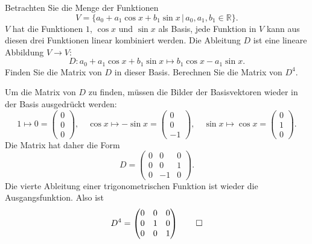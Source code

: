 Betrachten Sie die Menge der Funktionen
\[
V=\{
a_0+a_1\cos x+b_1\sin x\,|\,a_0,a_1,b_1\in\mathbb R\}.
\]
$V$ hat die Funktionen $1$, $\cos x$ und $\sin x$ als Basis,
jede Funktion in $V$ kann aus diesen drei Funktionen linear
kombiniert werden.
Die Ableitung $D$ ist eine lineare Abbildung $V\to V$:
\[
D:a_0+a_1\cos x+b_1\sin x\mapsto b_1\cos x -a_1\sin x.
\]
Finden Sie die Matrix von $D$ in dieser Basis. Berechnen Sie
die Matrix von $D^4$.


\begin{loesung}
Um die Matrix von $D$ zu finden, müssen die Bilder der
Basisvektoren wieder in der Basis ausgedrückt werden:
\[
1\mapsto 0=\begin{pmatrix}0\\0\\0\end{pmatrix},\quad
\cos x\mapsto -\sin x=\begin{pmatrix}0\\0\\-1\end{pmatrix},\quad
\sin x\mapsto \cos x=\begin{pmatrix}0\\1\\0\end{pmatrix}.
\]
Die Matrix hat daher die Form
\[
D=\begin{pmatrix}
0&0&0\\
0&0&1\\
0&-1&0
\end{pmatrix}.
\]
Die vierte Ableitung einer trigonometrischen Funktion ist wieder
die Ausgangsfunktion. Also ist
\[
D^4=\begin{pmatrix}
0&0&0\\
0&1&0\\
0&0&1
\end{pmatrix}
\qedhere
\]
\end{loesung}

